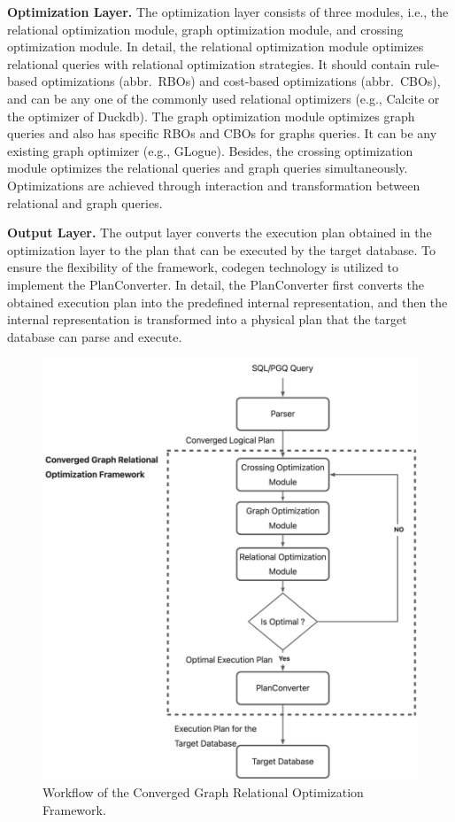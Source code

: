 \textbf{Optimization Layer.} The optimization layer consists of three modules, i.e., the relational optimization module, graph optimization module, and crossing optimization module.
In detail, the relational optimization module optimizes relational queries with relational optimization strategies.
It should contain rule-based optimizations (abbr.~RBOs) and cost-based optimizations (abbr.~CBOs), and can be any one of the commonly used relational optimizers (e.g., Calcite or the optimizer of Duckdb).
The graph optimization module optimizes graph queries and also has specific RBOs and CBOs for graphs queries.
It can be any existing graph optimizer (e.g., GLogue).
Besides, the crossing optimization module optimizes the relational queries and graph queries simultaneously.
Optimizations are achieved through interaction and transformation between relational and graph queries.

\textbf{Output Layer.} The output layer converts the execution plan obtained in the optimization layer to the plan that can be executed by the target database.
To ensure the flexibility of the framework, codegen technology is utilized to implement the PlanConverter.
In detail, the PlanConverter first converts the obtained execution plan into the predefined internal representation, and then the internal representation is transformed into a physical plan that the target database can parse and execute.

\begin{figure}
    \centering
    \includegraphics[width=\linewidth]{./figures/workflow.png}
    \caption{Workflow of the Converged Graph Relational Optimization Framework.}
    \label{fig:workflow}
\end{figure}

